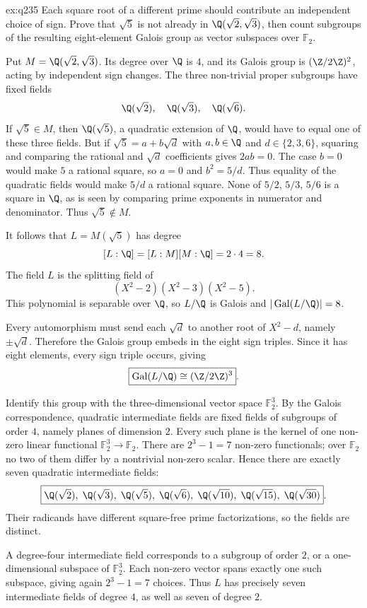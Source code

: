 \begin{solution}{ex:q235}
\idea Each square root of a different prime should contribute an independent choice of sign. Prove that $\sqrt5$ is not already in $\Q(\sqrt2,\sqrt3)$, then count subgroups of the resulting eight-element Galois group as vector subspaces over $\mathbb F_2$.

\writeup Put $M=\Q(\sqrt2,\sqrt3)$. Its degree over $\Q$ is $4$, and its Galois group is $(\Z/2\Z)^2$, acting by independent sign changes. The three non-trivial proper subgroups have fixed fields
\[
\Q(\sqrt2),\quad\Q(\sqrt3),\quad\Q(\sqrt6).
\]
If $\sqrt5\in M$, then $\Q(\sqrt5)$, a quadratic extension of $\Q$, would have to equal one of these three fields. But if $\sqrt5=a+b\sqrt d$ with $a,b\in\Q$ and $d\in\{2,3,6\}$, squaring and comparing the rational and $\sqrt d$ coefficients gives $2ab=0$. The case $b=0$ would make $5$ a rational square, so $a=0$ and $b^2=5/d$. Thus equality of the quadratic fields would make $5/d$ a rational square. None of $5/2$, $5/3$, $5/6$ is a square in $\Q$, as is seen by comparing prime exponents in numerator and denominator. Thus $\sqrt5\notin M$.

It follows that $L=M(\sqrt5)$ has degree
\[
[L:\Q]=[L:M][M:\Q]=2\cdot4=8.
\]
The field $L$ is the splitting field of
\[
(X^2-2)(X^2-3)(X^2-5).
\]
This polynomial is separable over $\Q$, so $L/\Q$ is Galois and $|\operatorname{Gal}(L/\Q)|=8$.

Every automorphism must send each $\sqrt d$ to another root of $X^2-d$, namely $\pm\sqrt d$. Therefore the Galois group embeds in the eight sign triples. Since it has eight elements, every sign triple occurs, giving
\[
\boxed{\operatorname{Gal}(L/\Q)\cong(\Z/2\Z)^3}.
\]

Identify this group with the three-dimensional vector space $\mathbb F_2^3$. By the Galois correspondence, quadratic intermediate fields are fixed fields of subgroups of order $4$, namely planes of dimension $2$. Every such plane is the kernel of one non-zero linear functional $\mathbb F_2^3\to\mathbb F_2$. There are $2^3-1=7$ non-zero functionals; over $\mathbb F_2$ no two of them differ by a nontrivial non-zero scalar. Hence there are exactly seven quadratic intermediate fields:
\[
\boxed{\Q(\sqrt2),\;\Q(\sqrt3),\;\Q(\sqrt5),\;
\Q(\sqrt6),\;\Q(\sqrt{10}),\;\Q(\sqrt{15}),\;\Q(\sqrt{30})}.
\]
Their radicands have different square-free prime factorizations, so the fields are distinct.

A degree-four intermediate field corresponds to a subgroup of order $2$, or a one-dimensional subspace of $\mathbb F_2^3$. Each non-zero vector spans exactly one such subspace, giving again $2^3-1=7$ choices. Thus $L$ has precisely seven intermediate fields of degree $4$, as well as seven of degree $2$.
\end{solution}

